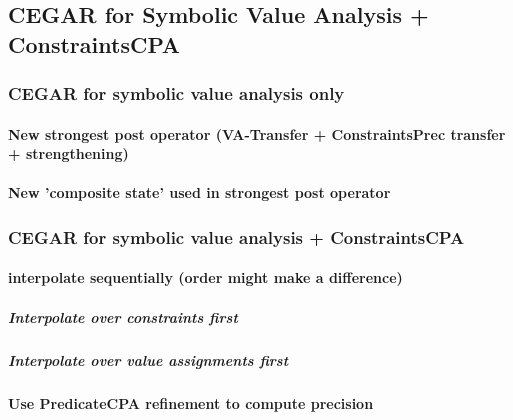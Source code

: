 \subsection{CEGAR for Symbolic Value Analysis + ConstraintsCPA}
\subsubsection{CEGAR for symbolic value analysis only}
\paragraph{New strongest post operator (VA-Transfer + ConstraintsPrec transfer + strengthening)}
\paragraph{New 'composite state' used in strongest post operator}
\subsubsection{CEGAR for symbolic value analysis + ConstraintsCPA}
\paragraph{interpolate sequentially (order might make a difference)}
\subparagraph{Interpolate over constraints first}
\subparagraph{Interpolate over value assignments first}
\paragraph{Use PredicateCPA refinement to compute precision}
